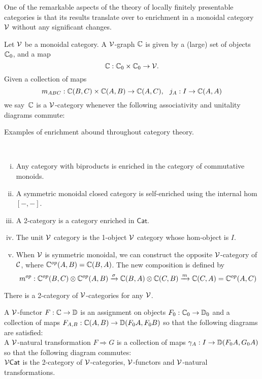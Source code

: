 One of the remarkable aspects of the theory of locally finitely presentable categories is that its results translate over to enrichment in a monoidal category $\mathcal{V}$ without any significant changes.
\begin{definition}%
\label{def:v-cat}
    Let $\mathcal{V}$ be a monoidal category. 
    A $\mathcal{V}$-graph $\mathbb{C}$ is given by a (large) set of objects $\mathbb{C}_0$, and a map
    \[
        \mathbb{C}: \mathbb{C}_0 \times \mathbb{C}_0 \to \mathcal{V}. 	
    \]
    Given a collection of maps
    \[
        m_{ABC}: \mathbb{C}(B,C) \times \mathbb{C}(A,B) \to \mathbb{C}(A,C), \hspace{0.25cm}
        j_A: I \to \mathbb{C}(A,A)	
    \]
    we say $\,\mathbb{C}$ is a $\mathcal{V}$-category whenever the following associativity and unitality diagrams commute:
    
    

\end{definition}
Examples of enrichment abound throughout category theory.
\begin{example}
    ~\begin{enumerate}[(i)]
        \item Any category with biproducts is enriched in the category of commutative monoids.
        \item A symmetric monoidal closed category is self-enriched using the internal hom $[-,-]$.
        \item A 2-category is a category enriched in $\mathsf{Cat}$. 
        \item The unit $\mathcal{V}$ category is the 1-object $\mathcal{V}$ category whose hom-object is $I$.
        \item When $\mathcal{V}$ is symmetric monoidal, we can construct the opposite $\mathcal{V}$-category of $\mathcal{C}$, where $\mathbb{C}^{op}(A,B) = \mathbb{C}(B, A)$.
        The new composition is defined by
        \[m^{op}: \mathbb{C}^{op}(B,C) \otimes \mathbb{C}^{op}(A,B) \xrightarrow{\sigma} \mathbb{C}(B, A) \otimes  \mathbb{C}(C,B) \xrightarrow{m} \mathbb{C}(C,A) = \mathbb{C}^{op}(A,C) \]
    \end{enumerate}
\end{example}
    
There is a 2-category of $\mathcal{V}$-categories for any $\mathcal{V}$.
\begin{definition}%
\label{def:vcat}
	A $\mathcal{V}$-functor $F: \mathbb{C} \to \mathbb{D}$ is an assignment on objects $F_0: \mathbb{C}_0 \to \mathbb{D}_0$ and a collection of maps $F_{A,B}: \mathbb{C}(A,B) \to \mathbb{D}(F_0A,F_0B)$ so that the following diagrams are satisfied:
    \[\]
	A $\mathcal{V}$-natural transformation $F \Rightarrow G$ is a collection of maps $\gamma_{A}: I \to \mathbb{D}(F_0A,G_0A)$ so that the following diagram commutes: \[\]
    $\mathcal{V}\mathsf{Cat}$ is the 2-category of $\mathcal{V}$-categories, $\mathcal{V}$-functors and $\mathcal{V}$-natural transformations.
\end{definition}
	
